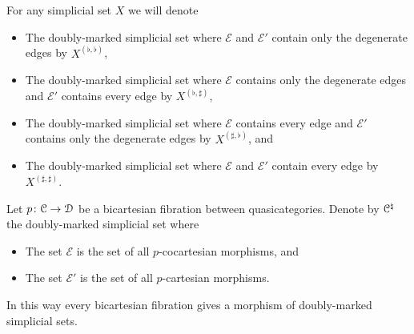 \documentclass[main.tex]{subfiles}
\begin{document}
\begin{example}
  For any simplicial set $X$ we will denote
  \begin{itemize}
    \item The doubly-marked simplicial set where $\mathcal{E}$ and $\mathcal{E}'$ contain only the degenerate edges by $X^{( \flat, \flat )}$,

    \item The doubly-marked simplicial set where $\mathcal{E}$ contains only the degenerate edges and $\mathcal{E}'$ contains every edge by $X^{( \flat, \sharp )}$,

    \item The doubly-marked simplicial set where $\mathcal{E}$ contains every edge and $\mathcal{E}'$ contains only the degenerate edges by $X^{( \sharp, \flat )}$, and

    \item The doubly-marked simplicial set where $\mathcal{E}$ and $\mathcal{E}'$ contain every edge by $X^{( \sharp, \sharp )}$.
  \end{itemize}
\end{example}

\begin{example}
  \label{eg:bicartesian_marking}
  Let $p\colon \mathcal{C} \to \mathcal{D}$ be a bicartesian fibration between quasicategories. Denote by $\mathcal{C}^{\natural}$ the doubly-marked simplicial set where
  \begin{itemize}
    \item The set $\mathcal{E}$ is the set of all $p$-cocartesian morphisms, and

    \item The set $\mathcal{E}'$ is the set of all $p$-cartesian morphisms.
  \end{itemize}

  In this way every bicartesian fibration gives a morphism of doubly-marked simplicial sets.
\end{example}

%
\end{document}

